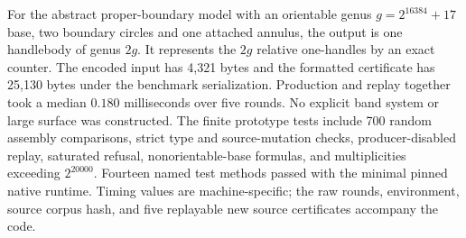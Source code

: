For the abstract proper-boundary model with an orientable genus
$g=2^{16384}+17$ base, two boundary circles and one attached annulus,
the output is one handlebody of genus $2g$.  It represents the
$2g$ relative one-handles by an exact counter.  The encoded input has
4,321 bytes and the formatted certificate has 25,130 bytes under the
benchmark serialization.  Production and replay together took a median
$0.180$ milliseconds over five rounds.  No explicit band system or
large surface was constructed.  The finite prototype tests include 700
random assembly comparisons, strict type and source-mutation checks,
producer-disabled replay, saturated refusal, nonorientable-base formulas,
and multiplicities exceeding $2^{20000}$.  Fourteen named test methods
passed with the minimal pinned native runtime.  Timing values are
machine-specific; the raw rounds, environment, source corpus hash, and
five replayable new source certificates accompany the code.
